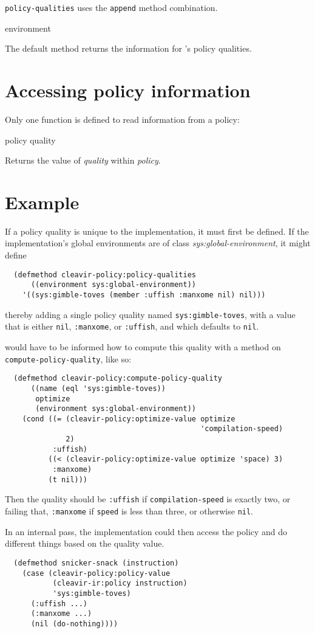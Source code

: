 \texttt{policy-qualities} uses the \texttt{append} method combination.

 {environment}

The default method returns the information for \sysname{}'s policy
qualities.

\section{Accessing policy information}

Only one function is defined to read information from a policy:

 {policy quality}

Returns the value of \textit{quality} within \textit{policy}.

\section{Example}

If a policy quality is unique to the implementation, it must first
be defined. If the implementation's global environments are of class \textit{sys:global-environment}, it might define

\begin{verbatim}
  (defmethod cleavir-policy:policy-qualities
      ((environment sys:global-environment))
    '((sys:gimble-toves (member :uffish :manxome nil) nil)))
\end{verbatim}

thereby adding a single policy quality named \texttt{sys:gimble-toves},
with a value that is either \texttt{nil}, \texttt{:manxome}, or
\texttt{:uffish}, and which defaults to \texttt{nil}.

\sysname{} would have to be informed how to compute this quality with
a method on \texttt{compute-policy-quality}, like so:

\begin{verbatim}
  (defmethod cleavir-policy:compute-policy-quality
      ((name (eql 'sys:gimble-toves))
       optimize
       (environment sys:global-environment))
    (cond ((= (cleavir-policy:optimize-value optimize
                                             'compilation-speed)
              2)
           :uffish)
          ((< (cleavir-policy:optimize-value optimize 'space) 3)
           :manxome)
          (t nil)))
\end{verbatim}

Then the quality should be \texttt{:uffish} if \texttt{compilation-speed}
is exactly two, or failing that, \texttt{:manxome} if \texttt{speed}
is less than three, or otherwise \texttt{nil}.

In an internal pass, the implementation could then access the policy
and do different things based on the quality value.

\begin{verbatim}
  (defmethod snicker-snack (instruction)
    (case (cleavir-policy:policy-value
           (cleavir-ir:policy instruction)
           'sys:gimble-toves)
      (:uffish ...)
      (:manxome ...)
      (nil (do-nothing))))
\end{verbatim}
